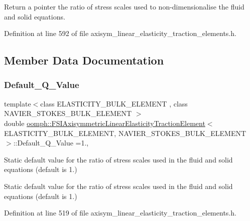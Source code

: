 Return a pointer the ratio of stress scales used to non-\/dimensionalise the fluid and solid equations. 



Definition at line 592 of file axisym\+\_\+linear\+\_\+elasticity\+\_\+traction\+\_\+elements.\+h.



\subsection{Member Data Documentation}
\mbox{\label{classoomph_1_1FSIAxisymmetricLinearElasticityTractionElement_aeff21738ba20eccede00f1db688e5a2a}} 
\subsubsection{\texorpdfstring{Default\+\_\+\+Q\+\_\+\+Value}{Default\_Q\_Value}}
{\footnotesize\ttfamily template$<$class E\+L\+A\+S\+T\+I\+C\+I\+T\+Y\+\_\+\+B\+U\+L\+K\+\_\+\+E\+L\+E\+M\+E\+NT , class N\+A\+V\+I\+E\+R\+\_\+\+S\+T\+O\+K\+E\+S\+\_\+\+B\+U\+L\+K\+\_\+\+E\+L\+E\+M\+E\+NT $>$ \\
double \hyperlink{classoomph_1_1FSIAxisymmetricLinearElasticityTractionElement}{oomph\+::\+F\+S\+I\+Axisymmetric\+Linear\+Elasticity\+Traction\+Element}$<$ E\+L\+A\+S\+T\+I\+C\+I\+T\+Y\+\_\+\+B\+U\+L\+K\+\_\+\+E\+L\+E\+M\+E\+NT, N\+A\+V\+I\+E\+R\+\_\+\+S\+T\+O\+K\+E\+S\+\_\+\+B\+U\+L\+K\+\_\+\+E\+L\+E\+M\+E\+NT $>$\+::Default\+\_\+\+Q\+\_\+\+Value =1.\hspace{0.3cm}{\ttfamily [static]}, {\ttfamily [protected]}}



Static default value for the ratio of stress scales used in the fluid and solid equations (default is 1.) 

Static default value for the ratio of stress scales used in the fluid and solid equations (default is 1.) 

Definition at line 519 of file axisym\+\_\+linear\+\_\+elasticity\+\_\+traction\+\_\+elements.\+h.

